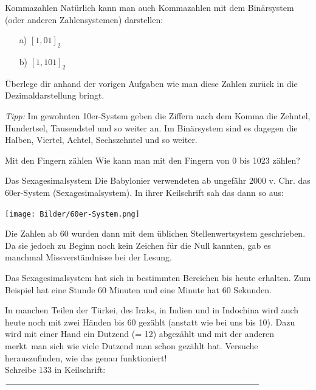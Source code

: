 \documentclass{uebungszettel}
\begin{document}
\begin{aufgabe}{Kommazahlen}
 Natürlich kann man auch Kommazahlen mit dem Binärsystem (oder anderen Zahlensystemen) darstellen:
 \begin{itemize}
 \item [a)] $\left[ 1{,}01 \right]_{2} $
 \item [b)] $\left[ 1{,}101 \right]_{2} $
 \end{itemize} 
Überlege dir anhand der vorigen Aufgaben wie man diese Zahlen zurück in die Dezimaldarstellung bringt.

\emph{Tipp:} Im gewohnten 10er-System geben die Ziffern nach dem Komma die Zehntel, Hundertsel, Tausendstel und so weiter an. Im Binärsystem sind
es dagegen die Halben, Viertel, Achtel, Sechszehntel und so weiter.
\end{aufgabe}

\vspace{5 cm}
\begin{aufgabe}{Mit den Fingern zählen}
Wie kann man mit den Fingern von 0 bis 1023 zählen?
\end{aufgabe}

\pagebreak
\vspace{-2 mm}
\begin{aufgabe}{Das Sexagesimalsystem}
Die Babylonier verwendeten ab ungefähr 2000 v. Chr. das 60er-System (Sexagesimalsystem). In ihrer Keilschrift sah das dann so aus:
\begin{center}
\texttt{[image: Bilder/60er-System.png]} 
\end{center}

Die Zahlen ab 60 wurden dann mit dem üblichen Stellenwertsystem geschrieben. Da sie jedoch zu Beginn noch kein Zeichen für die Null kannten, gab es manchmal Missverständnisse bei der Lesung.

Das Sexagesimalsystem hat sich in bestimmten Bereichen bis heute erhalten. Zum Beispiel hat eine Stunde 60 Minuten und eine Minute hat 60 Sekunden.

In manchen Teilen der Türkei, des Iraks, in Indien und in Indochina wird auch heute noch mit zwei Händen bis 60 gezählt (anstatt wie bei uns bis 10). Dazu 
wird mit einer Hand ein Dutzend (= 12) abgezählt und mit der anderen \glqq merkt\grqq \ man sich wie viele Dutzend man schon gezählt hat. Versuche 
herauszufinden, wie das genau funktioniert!\\

Schreibe 133 in Keilschrift: $\rule{10.5cm}{0.5px}$
\end{aufgabe}
\end{document}
